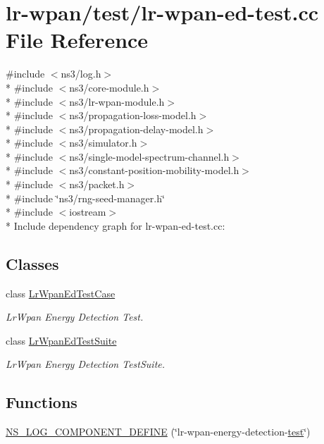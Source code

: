 \hypertarget{lr-wpan-ed-test_8cc}{}\section{lr-\/wpan/test/lr-\/wpan-\/ed-\/test.cc File Reference}
\label{lr-wpan-ed-test_8cc}
{\ttfamily \#include $<$ns3/log.\+h$>$}\\*
{\ttfamily \#include $<$ns3/core-\/module.\+h$>$}\\*
{\ttfamily \#include $<$ns3/lr-\/wpan-\/module.\+h$>$}\\*
{\ttfamily \#include $<$ns3/propagation-\/loss-\/model.\+h$>$}\\*
{\ttfamily \#include $<$ns3/propagation-\/delay-\/model.\+h$>$}\\*
{\ttfamily \#include $<$ns3/simulator.\+h$>$}\\*
{\ttfamily \#include $<$ns3/single-\/model-\/spectrum-\/channel.\+h$>$}\\*
{\ttfamily \#include $<$ns3/constant-\/position-\/mobility-\/model.\+h$>$}\\*
{\ttfamily \#include $<$ns3/packet.\+h$>$}\\*
{\ttfamily \#include \char`\"{}ns3/rng-\/seed-\/manager.\+h\char`\"{}}\\*
{\ttfamily \#include $<$iostream$>$}\\*
Include dependency graph for lr-\/wpan-\/ed-\/test.cc\+:
\subsection*{Classes}
\begin{DoxyCompactItemize}
\item 
class \hyperlink{classLrWpanEdTestCase}{Lr\+Wpan\+Ed\+Test\+Case}
\begin{DoxyCompactList}\small\item\em Lr\+Wpan Energy Detection Test. \end{DoxyCompactList}\item 
class \hyperlink{classLrWpanEdTestSuite}{Lr\+Wpan\+Ed\+Test\+Suite}
\begin{DoxyCompactList}\small\item\em Lr\+Wpan Energy Detection Test\+Suite. \end{DoxyCompactList}\end{DoxyCompactItemize}
\subsection*{Functions}
\begin{DoxyCompactItemize}
\item 
\hyperlink{lr-wpan-ed-test_8cc_a7a2fb300b6f1cdb82033b6348014d4bd}{N\+S\+\_\+\+L\+O\+G\+\_\+\+C\+O\+M\+P\+O\+N\+E\+N\+T\+\_\+\+D\+E\+F\+I\+NE} (\char`\"{}lr-\/wpan-\/energy-\/detection-\/\hyperlink{main-test-sync_8cc_a708a4c1a4d0c4acc4c447310dd4db27f}{test}\char`\"{})
\end{DoxyCompactItemize}
